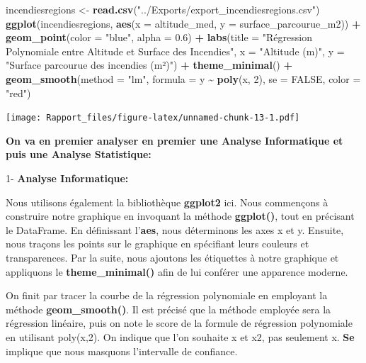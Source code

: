 \documentclass[
]{article}
\newenvironment{Shaded}{\begin{snugshade}}{\end{snugshade}}
\newcommand{\AttributeTok}[1]{\textcolor[rgb]{0.13,0.29,0.53}{#1}}
\newcommand{\ConstantTok}[1]{\textcolor[rgb]{0.56,0.35,0.01}{#1}}
\newcommand{\DecValTok}[1]{\textcolor[rgb]{0.00,0.00,0.81}{#1}}
\newcommand{\FloatTok}[1]{\textcolor[rgb]{0.00,0.00,0.81}{#1}}
\newcommand{\FunctionTok}[1]{\textcolor[rgb]{0.13,0.29,0.53}{\textbf{#1}}}
\newcommand{\NormalTok}[1]{#1}
\newcommand{\OtherTok}[1]{\textcolor[rgb]{0.56,0.35,0.01}{#1}}
\newcommand{\SpecialCharTok}[1]{\textcolor[rgb]{0.81,0.36,0.00}{\textbf{#1}}}
\newcommand{\StringTok}[1]{\textcolor[rgb]{0.31,0.60,0.02}{#1}}
\begin{document}
\begin{Shaded}
\begin{Highlighting}[]
\NormalTok{incendiesregions }\OtherTok{\textless{}{-}} \FunctionTok{read.csv}\NormalTok{(}\StringTok{"../Exports/export\_incendiesregions.csv"}\NormalTok{)}
\FunctionTok{ggplot}\NormalTok{(incendiesregions, }\FunctionTok{aes}\NormalTok{(}\AttributeTok{x =}\NormalTok{ altitude\_med, }\AttributeTok{y =}\NormalTok{ surface\_parcourue\_m2)) }\SpecialCharTok{+}
  \FunctionTok{geom\_point}\NormalTok{(}\AttributeTok{color =} \StringTok{"blue"}\NormalTok{, }\AttributeTok{alpha =} \FloatTok{0.6}\NormalTok{) }\SpecialCharTok{+}
  \FunctionTok{labs}\NormalTok{(}\AttributeTok{title =} \StringTok{"Régression Polynomiale entre Altitude et Surface des Incendies"}\NormalTok{,}
       \AttributeTok{x =} \StringTok{"Altitude (m)"}\NormalTok{, }\AttributeTok{y =} \StringTok{"Surface parcourue des incendies (m²)"}\NormalTok{) }\SpecialCharTok{+}
  \FunctionTok{theme\_minimal}\NormalTok{() }\SpecialCharTok{+}
  \FunctionTok{geom\_smooth}\NormalTok{(}\AttributeTok{method =} \StringTok{"lm"}\NormalTok{, }\AttributeTok{formula =}\NormalTok{ y }\SpecialCharTok{\textasciitilde{}} \FunctionTok{poly}\NormalTok{(x, }\DecValTok{2}\NormalTok{), }\AttributeTok{se =} \ConstantTok{FALSE}\NormalTok{, }\AttributeTok{color =} \StringTok{"red"}\NormalTok{)}
\end{Highlighting}
\end{Shaded}

\texttt{[image: Rapport\_files/figure-latex/unnamed-chunk-13-1.pdf]}

\textbf{On va en premier analyser en premier une Analyse Informatique et
puis une Analyse Statistique:}

1- \textbf{Analyse Informatique:}

Nous utilisons également la bibliothèque \textbf{ggplot2} ici. Nous
commençons à construire notre graphique en invoquant la méthode
\textbf{ggplot()}, tout en précisant le DataFrame. En définissant
l'\textbf{aes}, nous déterminons les axes x et y. Ensuite, nous traçons
les points sur le graphique en spécifiant leurs couleurs et
transparences. Par la suite, nous ajoutons les étiquettes à notre
graphique et appliquons le \textbf{theme\_minimal()} afin de lui
conférer une apparence moderne.

On finit par tracer la courbe de la régression polynomiale en employant
la méthode \textbf{geom\_smooth()}. Il est précisé que la méthode
employée sera la régression linéaire, puis on note le score de la
formule de régression polynomiale en utilisant poly(x,2). On indique que
l'on souhaite x et x2, pas seulement x. \textbf{Se} implique que nous
masquons l'intervalle de confiance.
\end{document}

